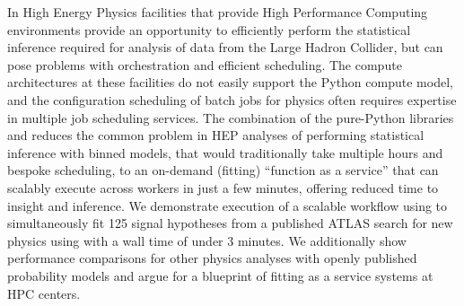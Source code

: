 In High Energy Physics facilities that provide High Performance Computing environments provide an opportunity to efficiently perform the statistical inference required for analysis of data from the Large Hadron Collider, but can pose problems with orchestration and efficient scheduling.
The compute architectures at these facilities do not easily support the Python compute model, and the configuration scheduling of batch jobs for physics often requires expertise in multiple job scheduling services.
The combination of the pure-Python libraries \pyhf{} and \funcX{} reduces the common problem in HEP analyses of performing statistical inference with binned models, that would traditionally take multiple hours and bespoke scheduling, to an on-demand (fitting) ``function as a service'' that can scalably execute across workers in just a few minutes, offering reduced time to insight and inference.
We demonstrate execution of a scalable workflow using \funcX{} to simultaneously fit 125 signal hypotheses from a published ATLAS search for new physics using \pyhf{} with a wall time of under 3 minutes.
We additionally show performance comparisons for other physics analyses with openly published probability models and argue for a blueprint of fitting as a service systems at HPC centers.
